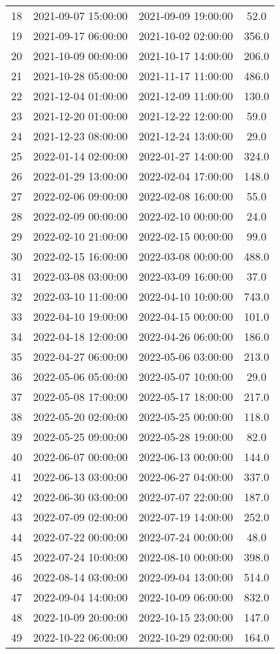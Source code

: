 \begin{center}
\begin{longtable}{|c|c|c|c|}
18 & 2021-09-07 15:00:00 & 2021-09-09 19:00:00 & 52.0\\ 
19 & 2021-09-17 06:00:00 & 2021-10-02 02:00:00 & 356.0\\ 
20 & 2021-10-09 00:00:00 & 2021-10-17 14:00:00 & 206.0\\ 
21 & 2021-10-28 05:00:00 & 2021-11-17 11:00:00 & 486.0\\ 
22 & 2021-12-04 01:00:00 & 2021-12-09 11:00:00 & 130.0\\ 
23 & 2021-12-20 01:00:00 & 2021-12-22 12:00:00 & 59.0\\ 
24 & 2021-12-23 08:00:00 & 2021-12-24 13:00:00 & 29.0\\ 
25 & 2022-01-14 02:00:00 & 2022-01-27 14:00:00 & 324.0\\ 
26 & 2022-01-29 13:00:00 & 2022-02-04 17:00:00 & 148.0\\ 
27 & 2022-02-06 09:00:00 & 2022-02-08 16:00:00 & 55.0\\ 
28 & 2022-02-09 00:00:00 & 2022-02-10 00:00:00 & 24.0\\ 
29 & 2022-02-10 21:00:00 & 2022-02-15 00:00:00 & 99.0\\ 
30 & 2022-02-15 16:00:00 & 2022-03-08 00:00:00 & 488.0\\ 
31 & 2022-03-08 03:00:00 & 2022-03-09 16:00:00 & 37.0\\ 
32 & 2022-03-10 11:00:00 & 2022-04-10 10:00:00 & 743.0\\ 
33 & 2022-04-10 19:00:00 & 2022-04-15 00:00:00 & 101.0\\ 
34 & 2022-04-18 12:00:00 & 2022-04-26 06:00:00 & 186.0\\ 
35 & 2022-04-27 06:00:00 & 2022-05-06 03:00:00 & 213.0\\ 
36 & 2022-05-06 05:00:00 & 2022-05-07 10:00:00 & 29.0\\ 
37 & 2022-05-08 17:00:00 & 2022-05-17 18:00:00 & 217.0\\ 
38 & 2022-05-20 02:00:00 & 2022-05-25 00:00:00 & 118.0\\ 
39 & 2022-05-25 09:00:00 & 2022-05-28 19:00:00 & 82.0\\ 
40 & 2022-06-07 00:00:00 & 2022-06-13 00:00:00 & 144.0\\ 
41 & 2022-06-13 03:00:00 & 2022-06-27 04:00:00 & 337.0\\ 
42 & 2022-06-30 03:00:00 & 2022-07-07 22:00:00 & 187.0\\ 
43 & 2022-07-09 02:00:00 & 2022-07-19 14:00:00 & 252.0\\ 
44 & 2022-07-22 00:00:00 & 2022-07-24 00:00:00 & 48.0\\ 
45 & 2022-07-24 10:00:00 & 2022-08-10 00:00:00 & 398.0\\ 
46 & 2022-08-14 03:00:00 & 2022-09-04 13:00:00 & 514.0\\ 
47 & 2022-09-04 14:00:00 & 2022-10-09 06:00:00 & 832.0\\ 
48 & 2022-10-09 20:00:00 & 2022-10-15 23:00:00 & 147.0\\ 
49 & 2022-10-22 06:00:00 & 2022-10-29 02:00:00 & 164.0\\ 
\hline
\end{longtable}
\end{center}